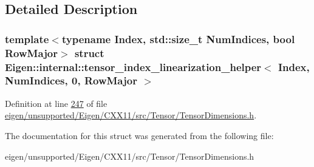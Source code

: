 \subsection{Detailed Description}
\subsubsection*{template$<$typename Index, std\+::size\+\_\+t Num\+Indices, bool Row\+Major$>$\newline
struct Eigen\+::internal\+::tensor\+\_\+index\+\_\+linearization\+\_\+helper$<$ Index, Num\+Indices, 0, Row\+Major $>$}



Definition at line \hyperlink{eigen_2unsupported_2_eigen_2_c_x_x11_2src_2_tensor_2_tensor_dimensions_8h_source_l00247}{247} of file \hyperlink{eigen_2unsupported_2_eigen_2_c_x_x11_2src_2_tensor_2_tensor_dimensions_8h_source}{eigen/unsupported/\+Eigen/\+C\+X\+X11/src/\+Tensor/\+Tensor\+Dimensions.\+h}.



The documentation for this struct was generated from the following file\+:\begin{DoxyCompactItemize}
\item 
eigen/unsupported/\+Eigen/\+C\+X\+X11/src/\+Tensor/\+Tensor\+Dimensions.\+h\end{DoxyCompactItemize}
